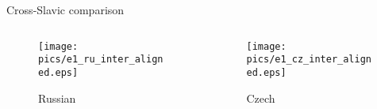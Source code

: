 \documentclass[xcolor=dvipsnames]{beamer}
\begin{document}
\begin{frame}{Cross-Slavic comparison}
    \begin{columns}
        \begin{column}{0.5\textwidth}
            \begin{figure}
                \centering
                \texttt{[image: pics/e1\_ru\_inter\_aligned.eps]}
                \caption{Russian}
                \label{fig:inter_ru}
            \end{figure}
        \end{column}

        \begin{column}{0.5\textwidth}
            \begin{figure}
                \centering
                \texttt{[image: pics/e1\_cz\_inter\_aligned.eps]}
                \caption{Czech}
                \label{fig:inter_cz}
            \end{figure}
        \end{column}
    \end{columns}
\end{frame}
\end{document}
